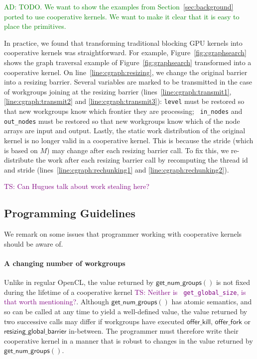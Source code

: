\documentclass[nocopyrightspace,10pt]{sigplanconf}
\newcommand{\ADComment}[1]{\textcolor{green}{AD: #1}}
\newcommand{\TSComment}[1]{\textcolor{purple}{TS: #1}}
\newcommand{\offerfork}{\mathsf{offer\_fork}}
\newcommand{\offerkill}{\mathsf{offer\_kill}}
\newcommand{\resizingglobalbarrier}{\mathsf{resizing\_global\_barrier}}
\newcommand{\getnumgroups}{\mathsf{get\_num\_groups}}
\begin{document}
\ADComment{TODO.  We want to show the examples from Section~\ref{sec:background} ported to use cooperative kernels.  We want to make it clear that it is easy to place the primitives.}

In practice, we found that transforming traditional blocking GPU
kernels into cooperative kernels was straightforward. For example,
Figure~\ref{fig:cgraphsearch} shows the graph traversal example of
Figure~\ref{fig:graphsearch} transformed into a cooperative kernel.
On line~\ref{line:cgraph:resizing}, we change the original barrier
into a resizing barrier. Several variables are marked to be
transmitted in the case of workgroups joining at the resizing barrier
(lines~\ref{line:cgraph:transmit1}, \ref{line:cgraph:transmit2} and
\ref{line:cgraph:transmit3}): {\tt level} must be restored so that
new workgroups know which frontier they are processing; {\tt
  in\_nodes} and {\tt out\_nodes} must be restored so that new
workgroups know which of the node arrays are input and output. Lastly,
the static work distribution of the original kernel is no longer valid
in a cooperative kernel. This is because the stride (which is based on
$M$) may change after each resizing barrier
call. To fix this, we re-distribute the work after each resizing
barrier call by recomputing the thread id and stride
(lines~\ref{line:cgraph:rechunking1} and
\ref{line:cgraph:rechunking2}).

\TSComment{Can Hugues talk about work stealing here?}




\subsection{Programming Guidelines}\label{sec:programmingguidelines}

We remark on some issues that programmer working with cooperative
kernels should be aware of.

\paragraph{A changing number of workgroups}  Unlike in regular OpenCL,
the value returned by $\getnumgroups()$ is not fixed during the
lifetime of a cooperative kernel \TSComment{Neither is {\tt
    get\_global\_size}, is that worth mentioning?}.  Although
$\getnumgroups()$ has atomic semantics, and so can be called at any
time to yield a well-defined value, the value returned by two
successive calls may differ if workgroups have executed $\offerkill$,
$\offerfork$ or $\resizingglobalbarrier$ in-between.  The programmer
must therefore write their cooperative kernel in a manner that is
robust to changes in the value returned by $\getnumgroups()$.
\end{document}
